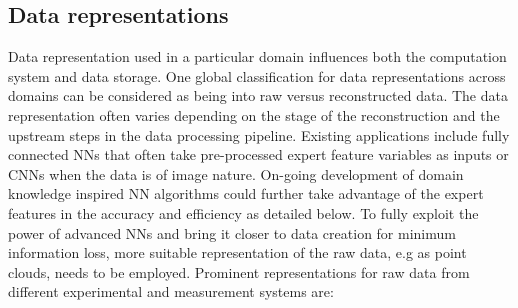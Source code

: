 \subsection{Data representations}
Data representation used in a particular domain influences both the computation system and data storage. One global classification for data representations across domains can be considered as being into raw versus reconstructed data. 
The data representation often varies depending on the stage of the reconstruction and the upstream steps in the data processing pipeline. Existing applications include fully connected NNs that often take pre-processed expert feature variables as inputs or CNNs when the data is of image nature. 
On-going development of domain knowledge inspired NN algorithms could further take advantage of the expert features in the accuracy and efficiency as detailed below.
To fully exploit the power of advanced NNs and bring it closer to data creation for minimum information loss, more suitable representation of the raw data, e.g as point clouds, needs to be employed. 
Prominent representations for raw data from different experimental and measurement systems are:
